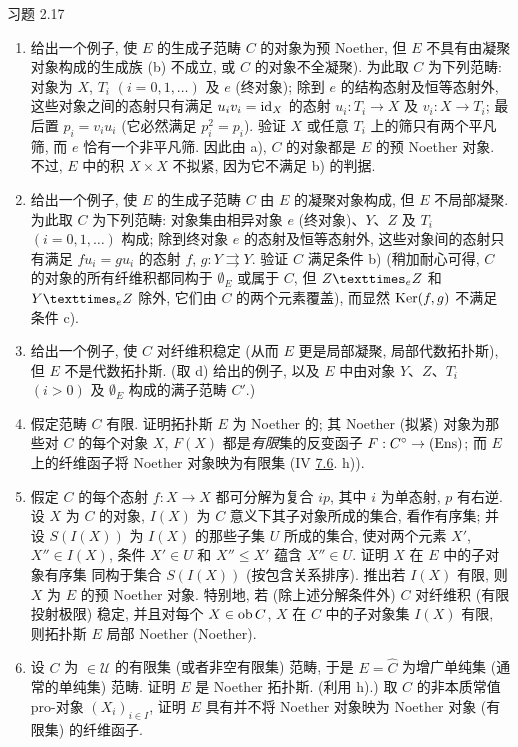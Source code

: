 \begin{enonce*}[remark]{习题 2.17}
\begin{enumerate}
\item 给出\pageoriginale{}一个例子,
使 $E$ 的生成子范畴 $C$ 的对象为预 Noether,
但 $E$ 不具有由凝聚对象构成的生成族
(\ie b) 不成立, 或 $C$ 的对象不全凝聚).
为此取 $C$ 为下列范畴:
对象为 $X$, $T_i$ $(i = 0, 1, \ldots)$
及 $e$ (终对象);
除到 $e$ 的结构态射及恒等态射外,
这些对象之间的态射只有满足 $u_i v_i = \operatorname{id}_X$ 的态射
$u_i : T_i \to X$ 及 $v_i : X \to T_i$;
最后置 $p_i = v_i u_i$ (它必然满足 $p_i^2 = p_i$).
验证 $X$ 或任意 $T_i$ 上的筛只有两个平凡筛,
而 $e$ 恰有一个非平凡筛.
因此由 a), $C$ 的对象都是 $E$ 的预 Noether 对象.
不过, $E$ 中的积 $X \times X$ 不拟紧,
因为它不满足 b) 的判据.

\item 给出一个例子,
使 $E$ 的生成子范畴 $C$ 由 $E$ 的凝聚对象构成,
但 $E$ 不局部凝聚.
为此取 $C$ 为下列范畴:
对象集由相异对象 $e$ (终对象)、$Y$、$Z$
及 $T_i$ $(i=0, 1, \ldots)$ 构成;
除到终对象 $e$ 的态射及恒等态射外,
这些对象间的态射只有满足 $fu_i = gu_i$ 的态射
$f$, $g : Y \rightrightarrows Y$.
验证 $C$ 满足条件 b)
(稍加耐心可得, $C$ 的对象的所有纤维积都同构于 $∅_E$
或属于 $C$,\pageoriginale{}
但 $\fprod{Z}{Z}{e}$ 和 $\fprod{Y}{Z}{e}$ 除外,
它们由 $C$ 的两个元素覆盖),
而显然 $\operatorname{Ker}(f, g)$ 不满足条件 c).

\item 给出一个例子, 使 $C$ 对纤维积稳定
(从而 $E$ 更是局部凝聚, \ie 局部代数拓扑斯),
但 $E$ 不是代数拓扑斯.
(取 d) 给出的例子,
以及 $E$ 中由对象 $Y$、$Z$、$T_{i}$ $(i > 0)$
及 $∅_{E}$ 构成的满子范畴 $C'$.)

\item 假定范畴 $C$ 有限.
证明拓扑斯 $E$ 为 Noether 的;
其 Noether (\ie 拟紧) 对象为那些对 $C$ 的每个对象 $X$,
$F(X)$ 都是\emph{有限}集的反变函子
$F : C^{\circ} \to (\Ens)$;
而 $E$ 上的纤维函子将 Noether 对象映为有限集
(\cf IV \hyperref[IV.exer7.6]{7.6}. h)).

\item 假定 $C$ 的每个态射 $f: X \to X$
都可分解为复合 $ip$, 其中 $i$ 为单态射, $p$ 有右逆.
设 $X$ 为 $C$ 的对象,
$I(X)$ 为 $C$ 意义下其子对象所成的集合, 看作有序集;
并设 $S(I(X))$ 为 $I(X)$ 的那些子集 $U$ 所成的集合,
使对两个元素 $X'$, $X'' \in I(X)$,
条件 $X'\in U$ 和 $X''\leq X'$ 蕴含 $X''\in U$.
证明 $X$ 在 $E$ 中的子对象有序集
同构于集合 $S(I(X))$ (按包含关系排序).
推出若 $I(X)$ 有限, 则 $X$ 为 $E$ 的预 Noether 对象.
特别地, 若 (除上述分解条件外)
$C$ 对纤维积 (\resp 有限投射极限) 稳定,
并且\pageoriginale{}对每个 $X \in \operatorname{ob} C$,
$X$ 在 $C$ 中的子对象集 $I(X)$ 有限,
则拓扑斯 $E$ 局部 Noether (\resp Noether).

\item 设 $C$ 为 $\in 𝒰$ 的有限集
(或者非空有限集) 范畴,
于是 $E = \widehat{C}$ 为增广单纯集
(\resp 通常的单纯集) 范畴.
证明 $E$ 是 Noether 拓扑斯. (利用 h).)
取 $C$ 的非本质常值 pro-对象 $(X_i)_{i \in I}$,
证明 $E$ 具有并不将 Noether 对象映为 Noether 对象
(\ie 有限集) 的纤维函子.


\end{enumerate}
\end{enonce*}
